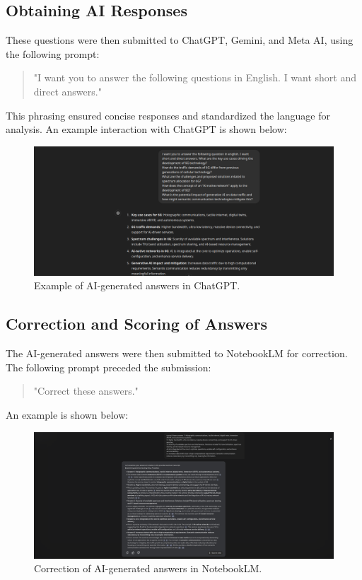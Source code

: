 \subsection{Obtaining AI Responses}
These questions were then submitted to ChatGPT, Gemini, and Meta AI, using the following prompt: 
\begin{quote}
"I want you to answer the following questions in English. I want short and direct answers."
\end{quote}
This phrasing ensured concise responses and standardized the language for analysis. An example interaction with ChatGPT is shown below:
\begin{figure}[H]
    \centering
    \includegraphics[scale=0.35]{Imagens/chatgpt.png}
    \caption{Example of AI-generated answers in ChatGPT.}
\end{figure}

\subsection{Correction and Scoring of Answers}
The AI-generated answers were then submitted to NotebookLM for correction. The following prompt preceded the submission:
\begin{quote}
"Correct these answers."
\end{quote}
An example is shown below:
\begin{figure}[H]
    \centering
    \includegraphics[scale=0.35]{Imagens/correction.png}
    \caption{Correction of AI-generated answers in NotebookLM.}
\end{figure}

